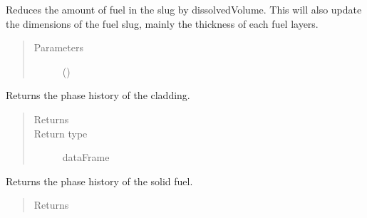 \documentclass[letterpaper,10pt,openany,oneside,english]{sphinxmanual}
\begin{document}
\begin{fulllineitems}
\begin{fulllineitems}
\label{\detokenize{support_rst/fuelslug:fuelslug.FuelSlug.ReduceFuelVolume}}
Reduces the amount of fuel in the slug by dissolvedVolume. This
will also update the dimensions of the fuel slug, mainly the thickness
of each fuel layers.
\begin{quote}\begin{description}
\item[{Parameters}] \leavevmode
{} () \textendash{} 

\end{description}\end{quote}

\end{fulllineitems}


\begin{fulllineitems}
\label{\detokenize{support_rst/fuelslug:fuelslug.FuelSlug.claddingPhase}}
Returns the phase history of the cladding.
\begin{quote}\begin{description}
\item[{Returns}] \leavevmode
{}

\item[{Return type}] \leavevmode
dataFrame

\end{description}\end{quote}

\end{fulllineitems}


\begin{fulllineitems}
\label{\detokenize{support_rst/fuelslug:fuelslug.FuelSlug.fuelPhase}}
Returns the phase history of the solid fuel.
\begin{quote}\begin{description}
\item[{Returns}] \leavevmode
{}


\end{description}
\end{quote}
\end{fulllineitems}
\end{fulllineitems}
\end{document}
